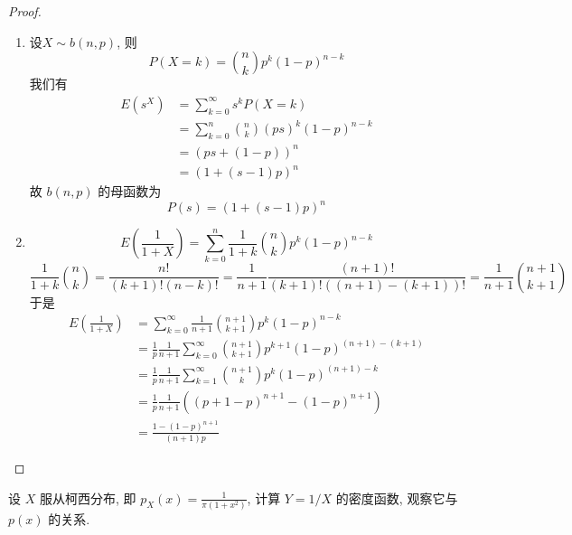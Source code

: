 \documentclass[../main.tex]{subfiles}
\begin{document}
\begin{proof}
    \begin{enumerate}
        \item 设\(  X\sim b\left( n,p \right)   \), 则 \[
        P\left( X= k \right)= \binom{ n }{k  }p^{k}\left( 1-p \right)^{n-k}   
        \] 我们有 \[
     \begin{aligned}
        E\left( s^{X} \right)&= \sum _{k= 0}^{\infty}s^{k}P\left( X= k \right)   \\ 
         &= \sum _{k= 0}^{n}\binom{ n }{k  } \left( ps \right)^{k}  \left( 1-p \right)^{n-k} \\ 
          &= \left( ps+ \left( 1-p \right)  \right)^{n}\\ 
           &= \left( 1+ \left( s-1 \right)p  \right)^{n}  
     \end{aligned}
        \]故 \(  b\left( n,p \right)   \) 的母函数为 \[
        P\left( s \right)= \left( 1+ \left( s-1 \right)p  \right)^{n}  
        \]
        \item    \[
        E\left( \frac{1 }{1+ X }  \right)=  \sum _{k= 0}^{n} \frac{1 }{1+ k }\binom{ n }{k  }p^{k}\left( 1-p \right)^{n-k}    
        \] \[
        \frac{1 }{1+ k } \binom{ n }{k  }= \frac{n! }{\left( k+ 1 \right) !\left( n-k \right)!  } = \frac{1 }{n+ 1 }\frac{\left( n+ 1 \right)!  }{\left( k+ 1 \right)!\left( \left( n+ 1 \right)-\left( k+ 1 \right)   \right)!   } = \frac{1 }{n+ 1 }\binom{ n+ 1 }{k+ 1  }    
        \]于是 \[
        \begin{aligned}
        E\left( \frac{1 }{1+ X }  \right)&= \sum _{k= 0}^{\infty} \frac{1 }{n+ 1 }\binom{ n+ 1 }{k+ 1  }p^{k}\left( 1-p \right)^{n-k}     \\ 
         &= \frac{1 }{p } \frac{1 }{n+ 1 }\sum _{k= 0}^{\infty} \binom{ n+ 1 }{k+ 1  }p^{k+ 1}\left( 1-p \right)^{\left( n+ 1 \right)-\left( k+ 1 \right)  } \\ 
          &= \frac{1 }{p }\frac{1 }{n+ 1 }\sum _{k= 1}^{\infty}\binom{ n+ 1 }{k  }p^{k}\left( 1-p \right)^{\left( n+ 1 \right)-k }\\ 
           &= \frac{1 }{p }\frac{1 }{n+ 1 }\left( \left( p+ 1-p \right)^{n+ 1} -\left( 1-p \right)^{n+ 1}   \right)         \\ 
            &= \frac{1-\left( 1-p \right)^{n+ 1}  }{\left( n+ 1 \right)p  } 
        \end{aligned}
        \]
    \end{enumerate}
    
\end{proof}
\begin{exercise}{}{}
设 $X$ 服从柯西分布, 即 $p_X(x) = \frac{1}{\pi(1+x^2)}$, 计算 $Y = 1/X$ 的密度函数, 观察它与 $p(x)$ 的关系.
\end{exercise}
\end{document}
